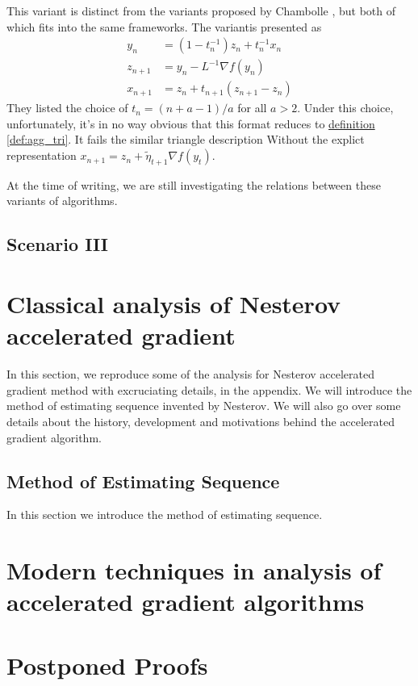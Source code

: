 \documentclass[12pt]{article}
\begin{document}
        \begin{remark}
            This variant is distinct from the variants proposed by Chambolle \cite{chambolle_convergence_2015}, but both of which fits into the same frameworks. 
            The variantis presented as 
            \begin{align*}
                y_n &= (1 - t_n^{-1})z_n + t_n^{-1} x_n
                \\
                z_{n + 1} &= y_n - L^{-1}\nabla f(y_n)
                \\
                x_{n + 1} &= z_n + t_{n + 1}(z_{n + 1} - z_n)
            \end{align*}
            They listed the choice of $t_n = (n + a - 1)/a$ for all $a > 2$. 
            Under this choice, unfortunately, it's in no way obvious that this format reduces to \hyperref[def:agg_tri]{definition \ref*{def:agg_tri}}. 
            It fails the similar triangle description Without the explict representation $x_{n + 1} = z_n + \tilde\eta_{t + 1}\nabla f(y_t)$. 
            \par\noindent
            At the time of writing, we are still investigating the relations between these variants of algorithms.
        \end{remark}
        
    \subsection{Scenario III}
    


\section{Classical analysis of Nesterov accelerated gradient}
    In this section, we reproduce some of the analysis for Nesterov accelerated gradient method with excruciating details, in the appendix. 
    We will introduce the method of estimating sequence invented by Nesterov. 
    We will also go over some details about the history, development and motivations behind the accelerated gradient algorithm. 
    \subsection{Method of Estimating Sequence}
        In this section we introduce the method of estimating sequence. 
    

\section{Modern techniques in analysis of accelerated gradient algorithms}
    

\printbibliography

\appendix
\section*{Postponed Proofs}
    
\end{document}
